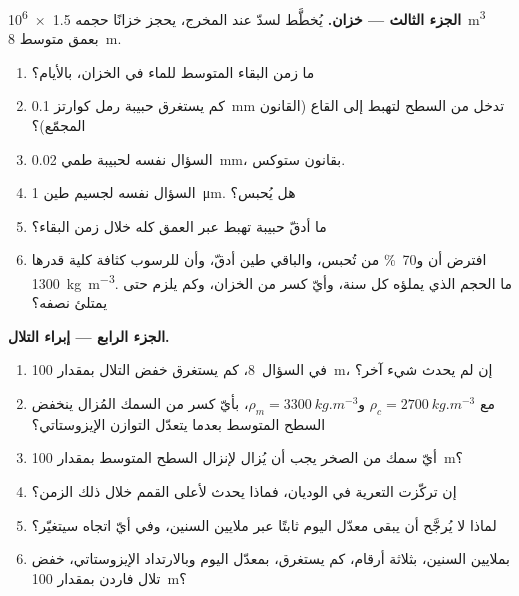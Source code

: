 \begin{problem}
\medskip
\noindent\textbf{الجزء الثالث --- خزان.}
يُخطَّط لسدّ عند المخرج، يحجز خزانًا حجمه \qty{1.5e6}{m^3} بعمق متوسط \qty{8}{m}.
\begin{enumerate}[resume]
  \item ما زمن البقاء المتوسط للماء في الخزان، بالأيام؟
  \item كم يستغرق حبيبة رمل كوارتز \qty{0.1}{mm} تدخل من السطح لتهبط إلى القاع (القانون المجمّع)؟
  \item السؤال نفسه لحبيبة طمي \qty{0.02}{mm}، بقانون ستوكس.
  \item السؤال نفسه لجسيم طين \qty{1}{\micro m}. هل يُحبس؟
  \item ما أدقّ حبيبة تهبط عبر العمق كله خلال زمن البقاء؟
  \item افترض أن  و\qty{70}{\percent} من  تُحبس، والباقي طين أدقّ، وأن للرسوب كثافة كلية قدرها \qty{1300}{kg.m^{-3}}. ما الحجم الذي يملؤه كل سنة، وأيّ كسر من الخزان، وكم يلزم حتى يمتلئ نصفه؟
\end{enumerate}

\medskip
\noindent\textbf{الجزء الرابع --- إبراء التلال.}
\begin{enumerate}[resume]
  \item {} في السؤال~8، كم يستغرق خفض التلال بمقدار \qty{100}{m}، إن لم يحدث شيء آخر؟
  \item مع $\rho_c = \qty{2700}{kg.m^{-3}}$ و$\rho_m =
        \qty{3300}{kg.m^{-3}}$، بأيّ كسر من السمك المُزال ينخفض السطح المتوسط بعدما يتعدّل التوازن الإيزوستاتي؟
  \item أيّ سمك من الصخر يجب أن يُزال لإنزال السطح المتوسط بمقدار \qty{100}{m}؟
  \item إن تركّزت التعرية في الوديان، فماذا يحدث لأعلى القمم خلال ذلك الزمن؟
  \item لماذا لا يُرجَّح أن يبقى معدّل اليوم ثابتًا عبر ملايين السنين، وفي أيّ اتجاه سيتغيّر؟
  \item بملايين السنين، بثلاثة أرقام، كم يستغرق، بمعدّل اليوم وبالارتداد الإيزوستاتي، خفض تلال فاردن بمقدار \qty{100}{m}؟
\end{enumerate}
\end{problem}
